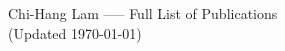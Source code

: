 \documentclass[preprint,pre,tightenlines,longbibliography]{revtex4-1}
\begin{document}
\begin{center}
{\Large Chi-Hang Lam  -----  Full List of Publications}\\[3mm]

{(Updated \today)}
\end{center}

\nocite{*}


%
%
%

\end{document}

